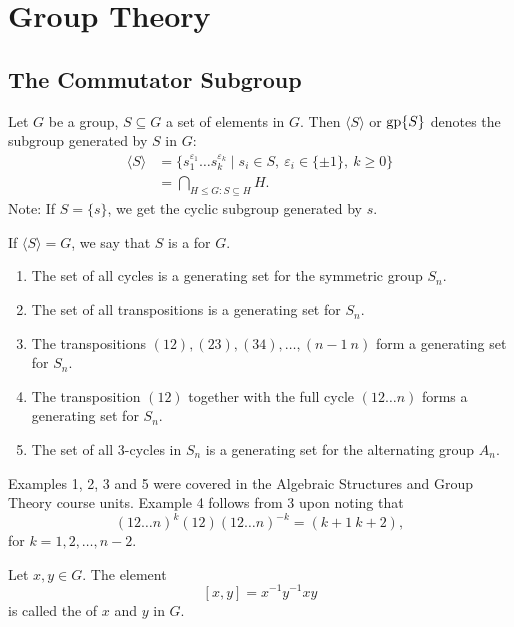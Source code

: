 \section{Group Theory}
\subsection{The Commutator Subgroup}
Let $G$ be a group, $S \subseteq G$ a set of elements in $G$. Then $\langle S \rangle$ or $\operatorname{gp}\{S\}$ denotes the subgroup generated by $S$ in $G$:
\begin{align*}
	\langle S \rangle &= \{s_1^{\varepsilon_1} \dots s_k^{\varepsilon_k} \mid s_i \in S,\ \varepsilon_i \in \{\pm 1\},\ k \geq 0\} \\
		& = \bigcap_{H \leq G : S \subseteq H}{H}.
\end{align*}
Note: If $S = \{s\}$, we get the cyclic subgroup generated by $s$.

If $\langle S \rangle = G$, we say that $S$ is a  for $G$.

\begin{examples}\hfill
	\begin{enumerate}
		\item The set of all cycles is a generating set for the symmetric group $S_n$.
		\item The set of all transpositions is a generating set for $S_n$.
		\item The transpositions $(12), (23), (34), \dots, (n - 1\ n)$ form a generating set for $S_n$.
		\item The transposition $(12)$ together with the full cycle $(12 \dots n)$ forms a generating set for $S_n$.
		\item The set of all $3$-cycles in $S_n$ is a generating set for the alternating group $A_n$.
	\end{enumerate}
	Examples 1, 2, 3 and 5 were covered in the Algebraic Structures and Group Theory course units. Example 4 follows from 3 upon noting that
	\[
		(12 \dots n)^k (12) (12 \dots n)^{-k} = (k + 1\ k + 2),
	\]
	for $k = 1, 2, \dots, n - 2$.
\end{examples}

\begin{definition}
	Let $x, y \in G$. The element
	\[
		[x, y] = x^{-1}y^{-1}xy
	\]\index{$[x, y]$}
	is called the  of $x$ and $y$ in $G$.
\end{definition}


